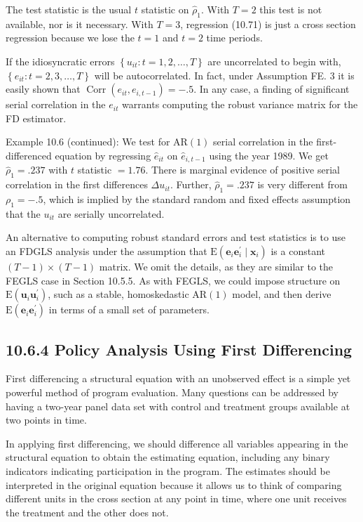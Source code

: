\documentclass[10pt]{article}
\begin{document}
The test statistic is the usual $t$ statistic on $\hat{\rho}_{1}$. With $T=2$ this test is not available, nor is it necessary. With $T=3$, regression (10.71) is just a cross section regression because we lose the $t=1$ and $t=2$ time periods.

If the idiosyncratic errors $\left\{u_{i t}: t=1,2, \ldots, T\right\}$ are uncorrelated to begin with, $\left\{e_{i t}: t=2,3, \ldots, T\right\}$ will be autocorrelated. In fact, under Assumption FE. 3 it is easily shown that $\operatorname{Corr}\left(e_{i t}, e_{i, t-1}\right)=-.5$. In any case, a finding of significant serial correlation in the $e_{i t}$ warrants computing the robust variance matrix for the FD estimator.

Example 10.6 (continued): We test for $\mathrm{AR}(1)$ serial correlation in the first-differenced equation by regressing $\hat{e}_{i t}$ on $\hat{e}_{i, t-1}$ using the year 1989. We get $\hat{\rho}_{1}=.237$ with $t$ statistic $=1.76$. There is marginal evidence of positive serial correlation in the first differences $\Delta u_{i t}$. Further, $\hat{\rho}_{1}=.237$ is very different from $\rho_{1}=-.5$, which is implied by the standard random and fixed effects assumption that the $u_{i t}$ are serially uncorrelated.

An alternative to computing robust standard errors and test statistics is to use an FDGLS analysis under the assumption that $\mathrm{E}\left(\mathbf{e}_{i} \mathbf{e}_{i}^{\prime} \mid \mathbf{x}_{i}\right)$ is a constant $(T-1) \times (T-1)$ matrix. We omit the details, as they are similar to the FEGLS case in Section 10.5.5. As with FEGLS, we could impose structure on $\mathrm{E}\left(\mathbf{u}_{i} \mathbf{u}_{i}^{\prime}\right)$, such as a stable, homoskedastic $\mathrm{AR}(1)$ model, and then derive $\mathrm{E}\left(\mathbf{e}_{i} \mathbf{e}_{i}^{\prime}\right)$ in terms of a small set of parameters.

\subsection*{10.6.4 Policy Analysis Using First Differencing}
First differencing a structural equation with an unobserved effect is a simple yet powerful method of program evaluation. Many questions can be addressed by having a two-year panel data set with control and treatment groups available at two points in time.

In applying first differencing, we should difference all variables appearing in the structural equation to obtain the estimating equation, including any binary indicators indicating participation in the program. The estimates should be interpreted in the original equation because it allows us to think of comparing different units in the cross section at any point in time, where one unit receives the treatment and the other does not.
\end{document}

